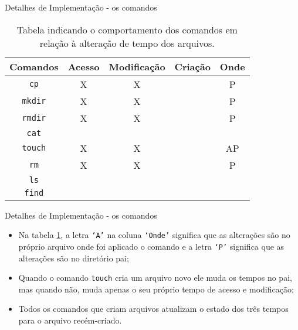\documentclass[10pt]{beamer}
\begin{document}
    \begin{frame}{Detalhes de Implementação - os comandos}
        \centering
        \begin{table}
            \begin{tabular}{|c|c|c|c|c|}
                \hline
                Comandos & Acesso & Modificação & Criação & Onde \\
                \hline
                \texttt{cp} & X & X & & P \\
                \hline
                \texttt{mkdir} & X & X & & P \\
                \hline
                \texttt{rmdir} & X & X & & P \\
                \hline
                \texttt{cat} &  &  & &  \\
                \hline
                \texttt{touch} & X & X & & AP \\
                \hline
                \texttt{rm} & X & X & & P \\
                \hline
                \texttt{ls} &  &  & &  \\
                \hline
                \texttt{find} &  &  & &  \\
                \hline
            \end{tabular}
            \caption{Tabela indicando o comportamento dos comandos em relação à
            alteração de tempo dos arquivos.} \label{tabela}
        \end{table}
    \end{frame}
    \begin{frame}{Detalhes de Implementação - os comandos}
        \begin{itemize}
            \justifying
            \item Na tabela \ref{tabela}, a letra \texttt{`A'} na coluna
                \texttt{`Onde'} significa que as alterações são no próprio
                arquivo onde foi aplicado o comando e a letra \texttt{`P'}
                significa que as alterações são no diretório pai;
            \item Quando o comando \texttt{touch} cria um arquivo novo ele muda
                os tempos no pai, mas quando não, muda apenas o seu próprio
                tempo de acesso e modificação;
            \item Todos os comandos que criam arquivos atualizam o estado dos
                três tempos para o arquivo recém-criado.
        \end{itemize}
    \end{frame}
\end{document}
